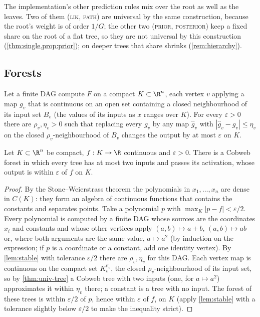 The implementation's other prediction rules mix over the root as well as the leaves.
Two of them (\textsc{lik}, \textsc{path}) are universal by the same construction, because
the root's weight is of order $1/G$; the other two (\textsc{prior}, \textsc{posterior})
keep a fixed share on the root of a flat tree, so they are not universal by this
construction (\cref{thm:single,prop:prior}); on deeper trees that share shrinks
(\cref{rem:hierarchy}).

\subsection{Forests}

\begin{lemma}\label{lem:stable}
Let a finite DAG compute $F$ on a compact $K\subset\R^n$, each vertex $v$ applying a map
$g_v$ that is continuous on an open set containing a closed neighbourhood of its input set
$B_v$ (the values of its inputs as $x$ ranges over $K$).  For every $\varepsilon>0$ there are
$\rho_v,\eta_v>0$ such that replacing every $g_v$ by any map $\hat g_v$ with
$|\hat g_v-g_v|\le\eta_v$ on the closed $\rho_v$-neighbourhood of $B_v$ changes the output by
at most $\varepsilon$ on $K$.
\end{lemma}

\begin{theorem}\label{thm:univ-forest}
Let $K\subset\R^n$ be compact, $f:K\to\R$ continuous and $\varepsilon>0$.  There is a
Cobweb forest in which every tree has at most two inputs and passes its activation, whose
output is within $\varepsilon$ of $f$ on $K$.
\end{theorem}

\begin{proof}
By the Stone--Weierstrass theorem \citep{stone1948} the polynomials in $x_1,\dots,x_n$
are dense in $C(K)$: they form an algebra of continuous functions that contains the
constants and separates points.  Take a polynomial $p$ with $\max_K|p-f|<\varepsilon/2$.
Every polynomial is computed by a finite DAG whose sources are the coordinates $x_i$ and
constants and whose other vertices apply $(a,b)\mapsto a+b$, $(a,b)\mapsto ab$ or, where
both arguments are the same value, $a\mapsto a^2$ (by induction on the expression; if $p$ is
a coordinate or a constant, add one identity vertex).  By \cref{lem:stable} with tolerance $\varepsilon/2$ there
are $\rho_v,\eta_v$ for this DAG.  Each vertex map is continuous on the compact set
$K_v^{\rho_v}$, the closed $\rho_v$-neighbourhood of its input set, so by
\cref{thm:univ-tree} a Cobweb tree with two inputs (one, for $a\mapsto a^2$) approximates it within $\eta_v$
there;
a constant is a tree with no input.  The forest of these trees is within $\varepsilon/2$ of
$p$, hence within $\varepsilon$ of $f$, on $K$ (apply \cref{lem:stable} with a tolerance
slightly below $\varepsilon/2$ to make the inequality strict).
\end{proof}

